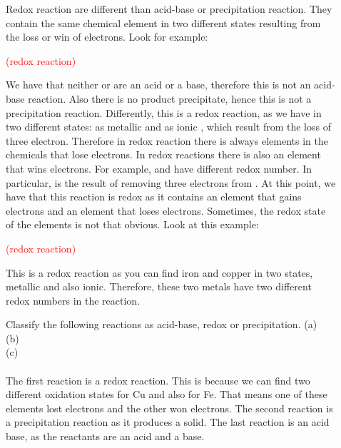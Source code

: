 \documentclass[main.tex]{subfiles}
\begin{document}
\begin{description}
\item[] Redox reaction are different than acid-base or precipitation reaction. They contain the same chemical element in two different states resulting from the loss or win of electrons. Look for example:
\begin{center}\textcolor{red}{ (redox reaction) }\end{center}
We have that neither  or  are an acid or a base, therefore this is not an acid-base reaction. Also there is no product precipitate, hence this is not a precipitation reaction. Differently, this is a redox reaction, as we have  in two different states: as metallic  and as ionic  , which result from the loss of three electron. Therefore in redox reaction there is always elements in the chemicals that lose electrons. In redox reactions there is also an element that wins electrons. For example,  and  have different redox number. In particular,  is the result of removing three electrons from . At this point, we have that this reaction is redox as it contains an element that gains electrons and an element that loses electrons. Sometimes, the redox state of the elements is not that obvious. Look at this example:
\begin{center}\textcolor{red}{ (redox reaction) }\end{center}
This is a redox reaction as you can find iron and copper in two states, metallic and also ionic. Therefore, these two metals have two different redox numbers in the reaction.
\begin{example} %
Classify the following reactions as acid-base, redox or precipitation.
(a)  \\
(b)   \\
(c)  \\
\\
The first reaction is a redox reaction. This is because we can find two different oxidation states for Cu and also for Fe. That means one of these elements lost electrons and the other won electrons. The second reaction is a precipitation reaction as it produces a solid. The last reaction is an acid base, as the reactants are an acid and a base.\\

\end{example}
\end{description}
\end{document}
